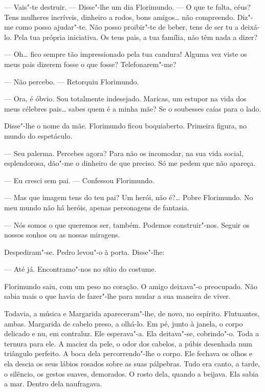 --- Vais"-te destruir. --- Disse"-lhe um dia Florimundo. --- O que te falta,
céus? Tens mulheres incríveis, dinheiro a rodos, bons amigos\ldots{} não
compreendo. Diz"-me como posso ajudar"-te. Não posso proibir"-te de beber,
tens de ser tu a deixá-lo. Pela tua própria iniciativa. Os teus pais, a
tua família, não têm nada a dizer?

--- Oh\ldots{} fico sempre tão impressionado pela tua candura! Alguma vez viste
os meus pais dizerem fosse o que fosse? Telefonarem"-me?

--- Não percebo. --- Retorquiu Florimundo.

--- Ora, é óbvio. Sou totalmente indesejado. Maricas, um estupor na vida
dos meus célebres pais\ldots{} sabes quem é a minha mãe? Se o soubesses caías
para o lado.

Disse"-lhe o nome da mãe. Florimundo ficou boquiaberto. Primeira figura,
no mundo do espetáculo.

--- Seu palerma. Percebes agora? Para não os incomodar, na sua vida
social, esplendorosa, dão"-me o dinheiro de que preciso. Só me pedem que
não apareça.

--- Eu cresci sem pai. --- Confessou Florimundo.

--- Mas que imagem tens do teu pai? Um herói, não é?\ldots{} Pobre Florimundo.
No meu mundo não há heróis, apenas personagens de fantasia.

--- Nós somos o que queremos ser, também. Podemos construir"-nos. Seguir os
nossos sonhos ou as nossas miragens.

Despediram"-se. Pedro levou"-o à porta. Disse"-lhe:

--- Até já. Encontramo"-nos no sítio do costume.

Florimundo saiu, com um peso no coração. O amigo deixava"-o preocupado.
Não sabia mais o que havia de fazer"-lhe para mudar a sua maneira de
viver.

Todavia, a música e Margarida apareceram"-lhe, de novo, no espírito.
Flutuantes, ambas. Margarida de cabelo preso, a olhá-lo. Em pé, junto à
janela, o corpo delicado e nu, em contraluz. Ele esperava"-a. Ela
deitava"-se, cobrindo"-o. Toda a ternura para ele. A maciez da pele, o
odor dos cabelos, a púbis desenhada num triângulo perfeito. A boca dela
percorrendo"-lhe o corpo. Ele fechava os olhos e ela descia os seus
lábios rosados sobre as suas pálpebras. Tudo era canto, a tarde, o
silêncio, os gestos suaves, demorados. O rosto dela, quando a beijava.
Ela sabia a mar. Dentro dela naufragava.

